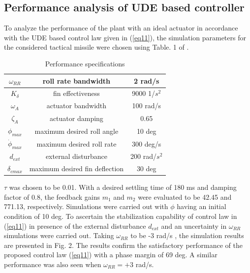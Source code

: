 \documentclass[conference]{IEEEtran}
\begin{document}
\subsection{Performance analysis of UDE based controller}
To analyze the performance of the plant with an ideal actuator in accordance with the UDE based control law given in (\ref{eq11}), the simulation parameters for the considered tactical missile were chosen using Table. 1 of \cite{talole2011}. 
%
\begin{table}[h]
\begin{center}
\caption{Performance specifications}\label{tb1}
\begin{tabular}{ccc}
\hline
$\omega_{RR}$ & roll rate bandwidth & 2 rad/s\\ \hline
$K_\delta$ & fin effectiveness & 9000 1/$s^2$\\ \hline
$\omega_A$ & actuator bandwidth & 100 rad/s\\ \hline
$\zeta_A$ & actuator damping & 0.65 \\ \hline
$\phi_{max}$ & maximum desired roll angle & 10 deg\\ \hline
$\dot{\phi}_{max}$ & maximum desired roll rate & 300 deg/s\\ \hline
$d_{ext}$ & external disturbance & 200 rad/$s^2$ \\ \hline
$\delta_{cmax}$ & maximum desired fin deflection & 30 deg \\ \hline
\end{tabular}
\end{center}
\end{table}
%
$\tau$ was chosen to be 0.01. With a desired settling time of 180 ms and damping factor of 0.8, the feedback gains $m_1$ and $m_2$ were evaluated to be 42.45 and 771.13, respectively. Simulations were carried out with $\phi$ having an initial condition of 10 deg.
To ascertain the stabilization capability of control law in (\ref{eq11}) in presence of the external disturbance $d_{ext}$ and an uncertainty in $\omega_{RR}$ simulations were carried out. Taking $\omega_{RR}$ to be -3 rad/s , the simulation results are presented in Fig. 2. The results confirm the satisfactory performance of the proposed control law (\ref{eq11}) with a phase margin of 69 deg. A similar performance was also seen when $\omega_{RR}= +3$ rad/s. 
\end{document}
